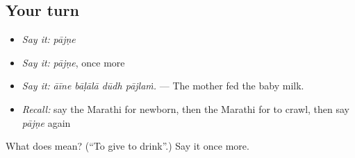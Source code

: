 \subsection*{Your turn}
\begin{itemize}
\raggedright
  \item \emph{Say it:} \emph{pājṇe}
  \item \emph{Say it:} \emph{pājṇe}, once more
  \item \emph{Say it:} \emph{āīne bāḷālā dūdh pājlaṁ.} — The mother fed the baby milk.
  \item \emph{Recall:} say the Marathi for newborn, then the Marathi for to crawl, then say \emph{pājṇe} again
\end{itemize}

\begin{tcolorbox}[breakable,colback=teal!4,colframe=teal!35!black,title={Before you move on}]
What does  mean? (\textquotedblleft{}To give to drink\textquotedblright{}.) Say it once more.
\end{tcolorbox}
